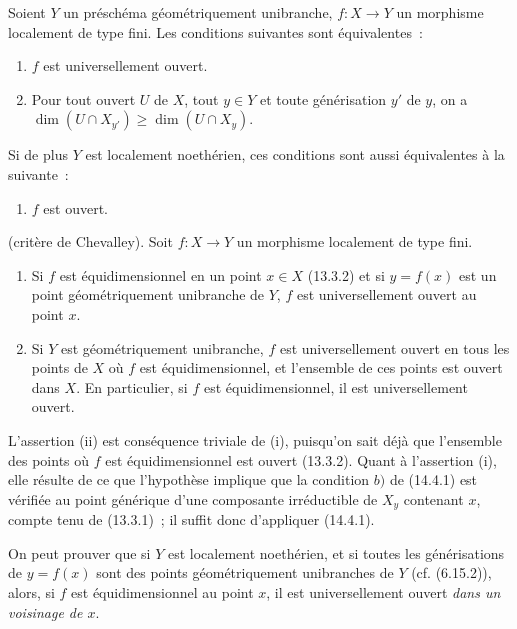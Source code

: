 \begin{corollary}[14.4.3]
\label{IV.14.4.3-fr}
Soient $Y$ un préschéma géométriquement unibranche, $f:X\to Y$ un morphisme
localement de type fini. Les conditions suivantes sont équivalentes~:
\begin{enumerate}[label=\emph{\alph*)}]
  \item $f$ est universellement ouvert.
  \item Pour tout ouvert $U$ de $X$, tout $y\in Y$ et toute générisation $y'$ de
  $y$, on a $\dim(U\cap X_{y'})\geq\dim(U\cap X_y)$.
\end{enumerate}
Si de plus $Y$ est localement noethérien, ces conditions sont aussi équivalentes à
la suivante~:
\begin{enumerate}[label=\emph{\alph*)}]
  \item[c)] $f$ est ouvert.
\end{enumerate}
\end{corollary}

\begin{corollary}[14.4.4]
(critère de Chevalley). Soit $f:X\to Y$ un morphisme localement de type fini.
\begin{enumerate}[label=(\roman*)]
  \item Si $f$ est équidimensionnel en un point $x\in X$ (13.3.2) et si
  $y=f(x)$ est un point géométriquement unibranche de $Y$, $f$ est
  universellement ouvert au point $x$.
  \item Si $Y$ est géométriquement unibranche, $f$ est universellement ouvert en
  tous les points de $X$ où $f$ est équidimensionnel, et l'ensemble de ces points
  est ouvert dans $X$. En particulier, si $f$ est équidimensionnel, il est
  universellement ouvert.
\end{enumerate}
\end{corollary}

L'assertion (ii) est conséquence triviale de (i), puisqu'on sait déjà que l'ensemble
des points où $f$ est équidimensionnel est ouvert (13.3.2). Quant à l'assertion (i),
elle résulte de ce que l'hypothèse implique que la condition $b)$ de (14.4.1) est
vérifiée au point générique d'une composante irréductible de $X_y$ contenant $x$,
compte tenu de (13.3.1)~; il suffit donc d'appliquer (14.4.1).

\begin{remark}[14.4.5]
\label{IV.14.4.5-fr}
On peut prouver que si $Y$ est localement noethérien, et si toutes les générisations
de $y=f(x)$ sont des points géométriquement unibranches de $Y$ (cf. (6.15.2)),
alors, si $f$ est équidimensionnel au point $x$, il est universellement ouvert
\emph{dans un voisinage de $x$}.
\end{remark}

